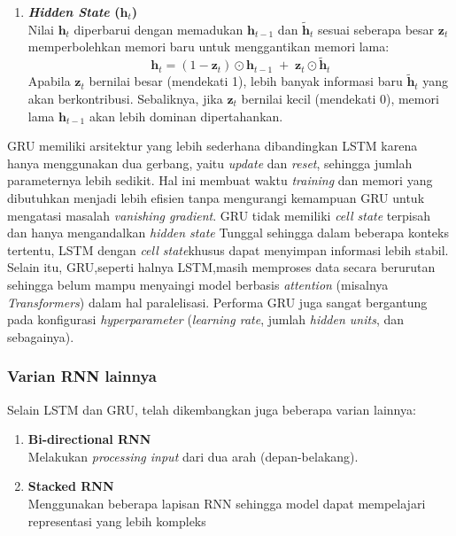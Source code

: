 \begin{enumerate}
\begin{enumerate}
    \item \textbf{\textit{Hidden State} (\(\mathbf{h}_t\))} \\
    Nilai \(\mathbf{h}_t\) diperbarui dengan memadukan \(\mathbf{h}_{t-1}\) dan \(\tilde{\mathbf{h}}_t\) sesuai seberapa besar \(\mathbf{z}_t\) memperbolehkan memori baru untuk menggantikan memori lama:
    \[
    \mathbf{h}_t = (1 - \mathbf{z}_t) \odot \mathbf{h}_{t-1} \;+\; \mathbf{z}_t \odot \tilde{\mathbf{h}}_t
    \]
    Apabila \(\mathbf{z}_t\) bernilai besar (mendekati 1), lebih banyak informasi baru \(\tilde{\mathbf{h}}_t\) yang akan berkontribusi. Sebaliknya, jika \(\mathbf{z}_t\) bernilai kecil (mendekati 0), memori lama \(\mathbf{h}_{t-1}\) akan lebih dominan dipertahankan.
\end{enumerate}


GRU memiliki arsitektur yang lebih sederhana dibandingkan LSTM karena hanya menggunakan dua gerbang, yaitu \textit{update} dan \textit{reset}, sehingga jumlah parameternya lebih sedikit. Hal ini membuat waktu \textit{training} dan memori yang dibutuhkan menjadi lebih efisien tanpa mengurangi kemampuan GRU untuk mengatasi masalah \textit{vanishing gradient}. GRU tidak memiliki \textit{cell state} terpisah dan hanya mengandalkan \textit{hidden state} Tunggal sehingga dalam beberapa konteks tertentu, LSTM dengan \textit{cell state}khusus dapat menyimpan informasi lebih stabil. Selain itu, GRU,seperti halnya LSTM,masih memproses data secara berurutan sehingga belum mampu menyaingi model berbasis \textit{attention} (misalnya \textit{Transformers}) dalam hal paralelisasi. Performa GRU juga sangat bergantung pada konfigurasi \textit{hyperparameter} (\textit{learning rate}, jumlah \textit{hidden units}, dan sebagainya).
\end{enumerate}


\subsubsection{Varian RNN lainnya }
Selain LSTM dan GRU, telah dikembangkan juga beberapa varian lainnya:
\begin{enumerate}
\item \textbf{Bi-directional RNN} \\
Melakukan \textit{processing input} dari dua arah (depan-belakang).
\item \textbf{Stacked RNN} \\
Menggunakan beberapa lapisan RNN sehingga model dapat mempelajari representasi yang lebih kompleks
\end{enumerate}


